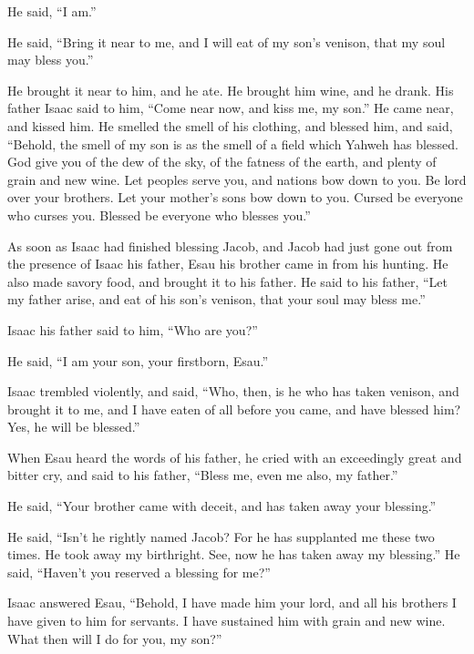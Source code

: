 He said, ``I am.''

 He said, ``Bring it near to me, and I will eat of my
son's venison, that my soul may bless you.''

He brought it near to him, and he ate. He brought him wine, and he
drank.  His father Isaac said to him, ``Come near now,
and kiss me, my son.''  He came near, and kissed him. He
smelled the smell of his clothing, and blessed him, and said, ``Behold,
the smell of my son is as the smell of a field which Yahweh has blessed.
 God give you of the dew of the sky, of the fatness of
the earth, and plenty of grain and new wine.  Let peoples
serve you, and nations bow down to you. Be lord over your brothers. Let
your mother's sons bow down to you. Cursed be everyone who curses you.
Blessed be everyone who blesses you.''

 As soon as Isaac had finished blessing Jacob, and Jacob
had just gone out from the presence of Isaac his father, Esau his
brother came in from his hunting.  He also made savory
food, and brought it to his father. He said to his father, ``Let my
father arise, and eat of his son's venison, that your soul may bless
me.''

 Isaac his father said to him, ``Who are you?''

He said, ``I am your son, your firstborn, Esau.''

 Isaac trembled violently, and said, ``Who, then, is he
who has taken venison, and brought it to me, and I have eaten of all
before you came, and have blessed him? Yes, he will be blessed.''

 When Esau heard the words of his father, he cried with
an exceedingly great and bitter cry, and said to his father, ``Bless me,
even me also, my father.''

 He said, ``Your brother came with deceit, and has taken
away your blessing.''

 He said, ``Isn't he rightly named Jacob? For he has
supplanted me these two times. He took away my birthright. See, now he
has taken away my blessing.'' He said, ``Haven't you reserved a blessing
for me?''

 Isaac answered Esau, ``Behold, I have made him your
lord, and all his brothers I have given to him for servants. I have
sustained him with grain and new wine. What then will I do for you, my
son?''

